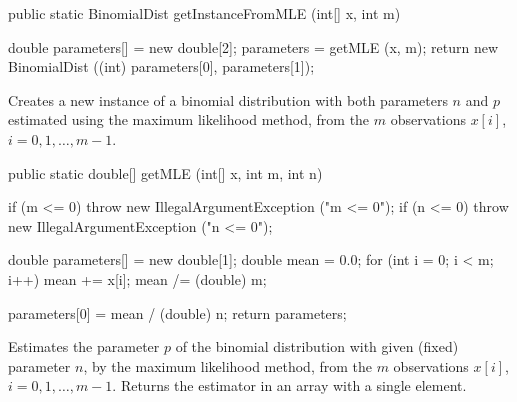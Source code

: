 \begin{htmlonly}
\end{htmlonly}
\begin{code}

   public static BinomialDist getInstanceFromMLE (int[] x, int m)\begin{hide} {
      double parameters[] = new double[2];
      parameters = getMLE (x, m);
      return new BinomialDist ((int) parameters[0], parameters[1]);
   }\end{hide}
\end{code}
\begin{tabb}
   Creates a new instance of a binomial distribution with both parameters
   ${n}$ and ${p}$ estimated using the maximum likelihood method, from
   the $m$ observations $x[i]$,  $i = 0, 1, \ldots, m-1$.
\end{tabb}
\begin{htmlonly}
\end{htmlonly}
\begin{code}

   public static double[] getMLE (int[] x, int m, int n)\begin{hide} {
      if (m <= 0)
         throw new IllegalArgumentException ("m <= 0");
      if (n <= 0)
         throw new IllegalArgumentException ("n <= 0");

      double parameters[] = new double[1];
      double mean = 0.0;
      for (int i = 0; i < m; i++)
         mean += x[i];
      mean /= (double) m;

      parameters[0] = mean / (double) n;
      return parameters;
   }\end{hide}
\end{code}
\begin{tabb}
   Estimates the parameter ${p}$ of the binomial distribution with
   given (fixed) parameter $n$, by the maximum likelihood method,
   from the $m$ observations $x[i]$, $i = 0, 1,\ldots, m-1$.
   Returns the estimator in an array with a single element.
\end{tabb}
\begin{htmlonly}
\end{htmlonly}
